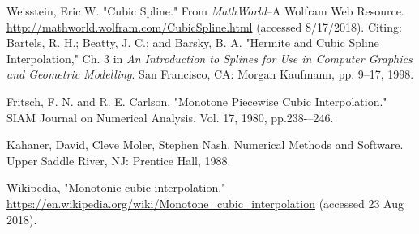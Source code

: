 \documentclass{scrartcl}
\begin{document}
\begin{thebibliography}{9}

Weisstein, Eric W. "Cubic Spline." From
\textit{MathWorld}--A Wolfram Web Resource.
\url{http://mathworld.wolfram.com/CubicSpline.html} (accessed
8/17/2018). Citing: Bartels, R. H.; Beatty, J. C.; and Barsky, B. A.
"Hermite and Cubic Spline Interpolation," Ch. 3 in
\textit{An Introduction to Splines for Use in Computer Graphics
and Geometric Modelling}. San Francisco, CA: Morgan Kaufmann,
pp. 9--17, 1998.

Fritsch, F. N. and R. E. Carlson. "Monotone Piecewise Cubic Interpolation." SIAM Journal on Numerical Analysis. Vol. 17, 1980, pp.238-–246.

Kahaner, David, Cleve Moler, Stephen Nash. Numerical Methods and Software. Upper Saddle River, NJ: Prentice Hall, 1988.

Wikipedia, "Monotonic cubic interpolation,"
\url{https://en.wikipedia.org/wiki/Monotone\_cubic\_interpolation}
(accessed 23 Aug 2018).

\end{thebibliography}
\end{document}
